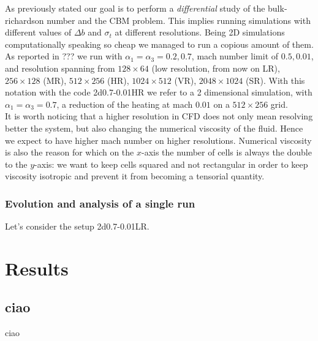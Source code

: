 \documentclass[11pt]{article}
\numberwithin{equation}{section}
\begin{document}
As previously stated our goal is to perform a \textit{differential} study of the bulk-richardson number and the CBM problem. This implies running simulations with different values of $\Delta b$ and $\sigma_t$ at different resolutions. Being 2D simulations computationally speaking so cheap we managed to run a copious amount of them. As reported in ??? we run with $\alpha_1=\alpha_3=0.2, 0.7$, mach number limit of $0.5, 0.01$, and resolution spanning from $128 \times 64$ (low resolution, from now on LR), $256 \times 128$ (MR), $512 \times 256$ (HR), $1024 \times 512$ (VR), $2048 \times 1024$ (SR). With this notation with the code 2d0.7-0.01HR we refer to a 2 dimensional simulation, with $\alpha_1=\alpha_3=0.7$, a reduction of the heating at mach $0.01$ on a $512 \times 256$ grid. \\
It is worth noticing that a higher resolution in CFD does not only mean resolving better the system, but also changing the numerical viscosity of the fluid. Hence we expect to have higher mach number on higher resolutions.
Numerical viscosity is also the reason for which on the $x$-axis the number of cells is always the double to the $y$-axis: we want to keep cells squared and not rectangular in order to keep viscosity isotropic and prevent it from becoming a tensorial quantity. \\

\subsubsection{Evolution and analysis of a single run}
Let's consider the setup 2d0.7-0.01LR.

\section{Results}
\subsection{ciao}
ciao
\end{document}
